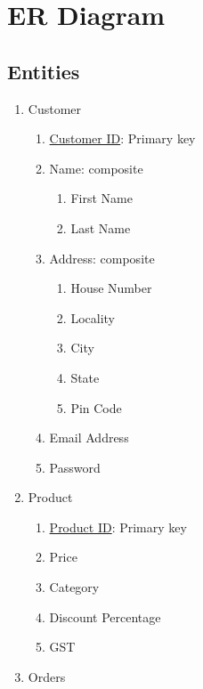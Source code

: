 \documentclass[12pt]{report}
\begin{document}
    \chapter{ER Diagram}
    
    \section{Entities}

    \begin{enumerate}
        \item Customer
            \begin{enumerate}
                \item \underline{Customer ID}: Primary key
                \item Name: composite
                    \begin{enumerate}
                        \item First Name
                        \item Last Name
                    \end{enumerate}
                \item Address: composite
                    \begin{enumerate}
                        \item House Number
                        \item Locality
                        \item City
                        \item State
                        \item Pin Code
                    \end{enumerate}
                \item Email Address
                \item Password
            \end{enumerate}
        \item Product
            \begin{enumerate}
                \item \underline{Product ID}: Primary key
                \item Price
                \item Category
                \item Discount Percentage
                \item GST
            \end{enumerate}
        \item Orders

\end{enumerate}
\end{document}
